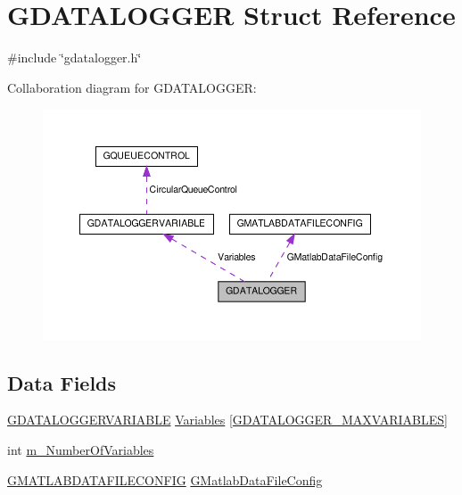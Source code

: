 \hypertarget{structGDATALOGGER}{\section{G\-D\-A\-T\-A\-L\-O\-G\-G\-E\-R Struct Reference}
\label{structGDATALOGGER}
}


{\ttfamily \#include \char`\"{}gdatalogger.\-h\char`\"{}}



Collaboration diagram for G\-D\-A\-T\-A\-L\-O\-G\-G\-E\-R\-:\nopagebreak
\begin{figure}[H]
\begin{center}
\leavevmode
\includegraphics[width=350pt]{structGDATALOGGER__coll__graph}
\end{center}
\end{figure}
\subsection*{Data Fields}
\begin{DoxyCompactItemize}
\item 
\hyperlink{structGDATALOGGERVARIABLE}{G\-D\-A\-T\-A\-L\-O\-G\-G\-E\-R\-V\-A\-R\-I\-A\-B\-L\-E} \hyperlink{structGDATALOGGER_a6af9584d8665205b950cb2dcc5f90a94}{Variables} \mbox{[}\hyperlink{gdatalogger_8h_a2ddc529b6734b7a9222a5fbd1305581e}{G\-D\-A\-T\-A\-L\-O\-G\-G\-E\-R\-\_\-\-M\-A\-X\-V\-A\-R\-I\-A\-B\-L\-E\-S}\mbox{]}
\item 
int \hyperlink{structGDATALOGGER_a2ac727ee6c50f7e04030cbe531158f08}{m\-\_\-\-Number\-Of\-Variables}
\item 
\hyperlink{structGMATLABDATAFILECONFIG}{G\-M\-A\-T\-L\-A\-B\-D\-A\-T\-A\-F\-I\-L\-E\-C\-O\-N\-F\-I\-G} \hyperlink{structGDATALOGGER_a062fd3836dbd0b1bec129ab372bff04a}{G\-Matlab\-Data\-File\-Config}
\end{DoxyCompactItemize}


